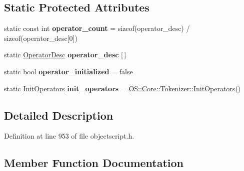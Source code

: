 \subsection*{Static Protected Attributes}
\begin{DoxyCompactItemize}
\item 
static const int {\bfseries operator\+\_\+count} = sizeof(operator\+\_\+desc) / sizeof(operator\+\_\+desc\mbox{[}0\mbox{]})\hypertarget{class_object_script_1_1_o_s_1_1_core_1_1_tokenizer_aabf908e6788da7d50aa864f02adf3f15}{}\label{class_object_script_1_1_o_s_1_1_core_1_1_tokenizer_aabf908e6788da7d50aa864f02adf3f15}

\item 
static \hyperlink{struct_object_script_1_1_o_s_1_1_core_1_1_tokenizer_1_1_operator_desc}{Operator\+Desc} {\bfseries operator\+\_\+desc} \mbox{[}$\,$\mbox{]}\hypertarget{class_object_script_1_1_o_s_1_1_core_1_1_tokenizer_a830c7587c0f4124f61ceffaa3b7109b5}{}\label{class_object_script_1_1_o_s_1_1_core_1_1_tokenizer_a830c7587c0f4124f61ceffaa3b7109b5}

\item 
static bool {\bfseries operator\+\_\+initialized} = false\hypertarget{class_object_script_1_1_o_s_1_1_core_1_1_tokenizer_a99d08655293a9e986d2df6a999f92b34}{}\label{class_object_script_1_1_o_s_1_1_core_1_1_tokenizer_a99d08655293a9e986d2df6a999f92b34}

\item 
static \hyperlink{struct_object_script_1_1_o_s_1_1_core_1_1_tokenizer_1_1_init_operators}{Init\+Operators} {\bfseries init\+\_\+operators} = \hyperlink{struct_object_script_1_1_o_s_1_1_core_1_1_tokenizer_1_1_init_operators}{O\+S\+::\+Core\+::\+Tokenizer\+::\+Init\+Operators}()\hypertarget{class_object_script_1_1_o_s_1_1_core_1_1_tokenizer_aaebd1b29c69399edb563cc77d4d7c7da}{}\label{class_object_script_1_1_o_s_1_1_core_1_1_tokenizer_aaebd1b29c69399edb563cc77d4d7c7da}

\end{DoxyCompactItemize}


\subsection{Detailed Description}


Definition at line 953 of file objectscript.\+h.



\subsection{Member Function Documentation}
